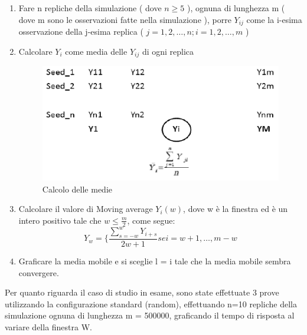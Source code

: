 \begin{enumerate}
	\item Fare n repliche della simulazione ( dove $n\geq5$ ), ognuna di lunghezza m ( dove m sono le osservazioni fatte nella simulazione ), porre $Y_{ij}$ come la i-esima osservazione della j-esima replica ( $j = 1,2,\ldots,n; i = 1,2,\ldots ,m$ )
	\item Calcolare $Y_{i}$ come media delle $Y_{ij}$ di ogni replica
\begin{figure}[H]
\begin{center}
\includegraphics[scale=0.65]{etc/ipsilon.png}
\caption{Calcolo delle medie}
\label{carico}
\end{center}
\end{figure}
	\item Calcolare il valore di Moving average $Y_{i}(w)$, dove w è la finestra ed è un intero positivo tale che $w \leq \frac{m}{2}$, come segue: 
$$
Y_{w} = \lbrace{ \frac{\sum_{s=-w}^{w} Y_{i+s}}{2w+1} se i=w+1, \ldots,m-w }
$$
	\item Graficare la media mobile e si sceglie l = i tale che la media mobile sembra convergere.
\end{enumerate}
Per quanto riguarda il caso di studio in esame, sono state effettuate 3 prove utilizzando la configurazione standard (random), effettuando n=10 repliche della simulazione ognuna di lunghezza
m = 500000, graficando il tempo di risposta al variare della finestra W.

